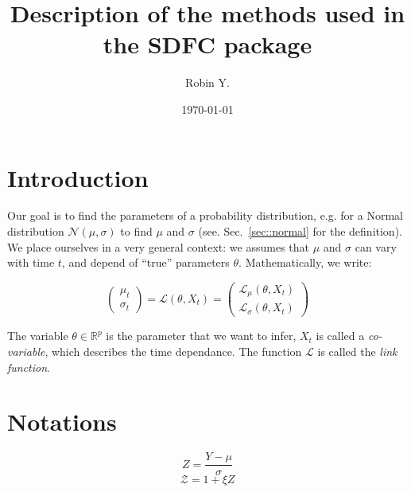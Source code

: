 \documentclass[12pt,a4paper]{article}
\title{Description of the methods used in the SDFC package}
\author{Robin Y.}
\date{\today}
\theoremstyle{plain}
\theoremstyle{definition}
\theoremstyle{remark}
\newcommand{\RR}{\mathbb{R}}
\newcommand{\lL}{\mathcal{L}}
\newcommand{\nN}{\mathcal{N}}
\newcommand{\zZ}{\mathcal{Z}}
\begin{document}

\maketitle



\begin{abstract}
\end{abstract}






\tableofcontents


\section*{Introduction} %

\noindent Our goal is to find the parameters of a probability distribution, e.g.
for a Normal distribution $\nN(\mu,\sigma)$ to find $\mu$ and $\sigma$ (see.
Sec.~\ref{sec::normal} for the definition). We place ourselves in a very general
context: we assumes that $\mu$ and $\sigma$ can vary with time $t$, and depend
of ``true'' parameters $\theta$. Mathematically, we write:

\[
\begin{pmatrix} \mu_t \\ \sigma_t \end{pmatrix}
= \lL(\theta,X_t)
= \begin{pmatrix} \lL_\mu(\theta,X_t) \\ \lL_\sigma(\theta,X_t)\end{pmatrix}
\]

\noindent The variable $\theta\in\RR^p$ is the parameter that we want to infer,
$X_t$ is called a \emph{co-variable}, which describes the time dependance. The
function $\lL$ is called the \emph{link function}.



\section*{Notations} %

\[Z = \frac{Y-\mu}{\sigma}\]
\[\zZ = 1+\xi Z\]
\end{document}
